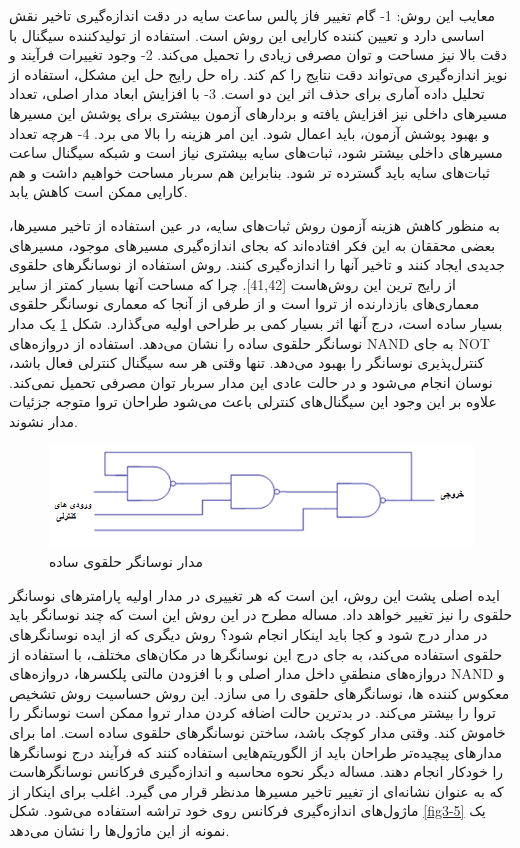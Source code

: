 معایب این روش:
1-	گام تغییر فاز پالس ساعت سایه در دقت اندازه‌گیری تاخیر نقش اساسی دارد و تعیین کننده کارایی این روش است. استفاده از تولیدکننده سیگنال با دقت بالا نیز مساحت و توان مصرفی زیادی را تحمیل می‌کند.
2-	وجود تغییرات فرآیند و نویز اندازه‌گیری می‌تواند دقت نتایج را کم کند. راه حل رایج حل این مشکل، استفاده از تحلیل داده آماری برای حذف اثر این دو است.
3-	با افزایش ابعاد مدار اصلی، تعداد مسیرهای داخلی نیز افزایش یافته و بردارهای آزمون بیشتری برای پوشش این مسیرها و بهبود پوشش آزمون،  باید اعمال شود. این امر هزینه را بالا می برد. 
4-	هرچه تعداد مسیرهای داخلی بیشتر شود، ثبات‌های سایه بیشتری نیاز است و شبکه سیگنال ساعت ثبات‌های سایه باید گسترده تر شود. بنابراین هم سربار مساحت خواهیم داشت و هم کارایی ممکن است کاهش یابد.


به منظور کاهش هزینه آزمون روش ثبات‌های سایه، در عین استفاده از تاخیر مسیرها، بعضی محققان به این فکر افتاده‌اند که بجای اندازه‌گیری مسیرهای موجود، مسیرهای جدیدی ایجاد کنند و تاخیر آنها را اندازه‌گیری کنند. روش استفاده از نوسانگرهای حلقوی از رایج ترین این روش‌هاست [41,42]. چرا که مساحت آنها بسیار کمتر از سایر معماری‌های بازدارنده از تروا است و از طرفی از آنجا که معماری نوسانگر حلقوی بسیار ساده است، درج آنها اثر بسیار کمی بر طراحی اولیه می‌گذارد.
شکل \ref{fig2-5} یک مدار نوسانگر حلقوی ساده را نشان می‌دهد. استفاده از دروازه‌های NAND به جای NOT کنترل‌پذیری نوسانگر را بهبود می‌دهد. تنها وقتی هر سه سیگنال کنترلی فعال باشد، نوسان انجام می‌شود و در حالت عادی این مدار سربار توان مصرفی تحمیل نمی‌کند. علاوه بر این وجود این سیگنال‌های کنترلی باعث می‌شود طراحان تروا متوجه جزئیات مدار نشوند.
 \begin{figure}
\begin{center}
\includegraphics[scale=1]{figs/fig2-5.png}
\caption{مدار نوسانگر حلقوی ساده}
\label{fig2-5}
\end{center}
\end{figure} 
 
ایده اصلی پشت این روش، این است که هر تغییری در مدار اولیه پارامترهای نوسانگر حلقوی را نیز تغییر خواهد داد. مساله مطرح در این روش این است که چند نوسانگر باید در مدار درج شود و کجا باید اینکار انجام شود؟
روش دیگری که از ایده نوسانگرهای حلقوی استفاده می‌کند، به جای درج این نوسانگرها در مکان‌های مختلف، با استفاده از دروازه‌های منطقیِ داخل مدار اصلی و با افزودن مالتی پلکسرها، دروازه‌های NAND و معکوس کننده ها، نوسانگرهای حلقوی را می سازد. این روش حساسیت روش تشخیص تروا را بیشتر می‌کند. در بدترین حالت اضافه کردن مدار تروا ممکن است نوسانگر را خاموش کند.
وقتی مدار کوچک باشد، ساختن نوسانگرهای حلقوی ساده است. اما برای مدارهای پیچیده‌تر طراحان باید از الگوریتم‌هایی استفاده کنند که فرآیند درج نوسانگرها را خودکار انجام دهند. مساله دیگر نحوه محاسبه و اندازه‌گیری فرکانس نوسانگرهاست که به عنوان نشانه‌ای از تغییر تاخیر مسیرها مدنظر قرار می گیرد. اغلب برای اینکار از ماژول‌های اندازه‌گیری فرکانس روی خود تراشه استفاده می‌شود. شکل \ref{fig3-5} یک نمونه از این ماژول‌ها را نشان می‌دهد.

